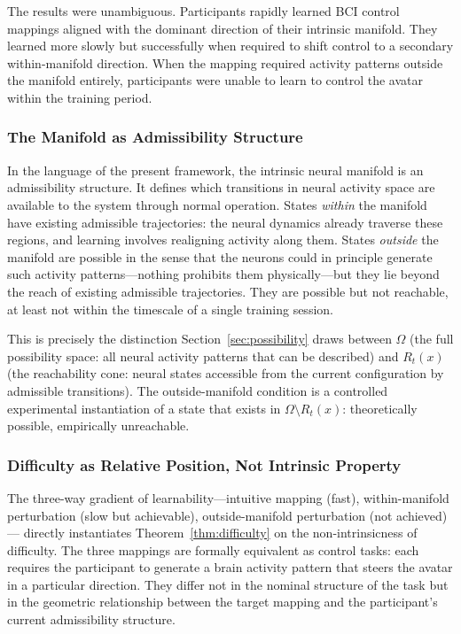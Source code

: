 \documentclass[12pt, a4paper]{article}
\theoremstyle{plain}
\theoremstyle{definition}
\theoremstyle{remark}
\begin{document}
The results were unambiguous. Participants rapidly learned BCI control
mappings aligned with the dominant direction of their intrinsic manifold.
They learned more slowly but successfully when required to shift control
to a secondary within-manifold direction. When the mapping required
activity patterns outside the manifold entirely, participants were unable
to learn to control the avatar within the training period.

\subsubsection*{The Manifold as Admissibility Structure}

In the language of the present framework, the intrinsic neural manifold
is an admissibility structure. It defines which transitions in neural
activity space are available to the system through normal operation.
States \emph{within} the manifold have existing admissible trajectories:
the neural dynamics already traverse these regions, and learning involves
realigning activity along them. States \emph{outside} the manifold are
possible in the sense that the neurons could in principle generate such
activity patterns---nothing prohibits them physically---but they lie beyond
the reach of existing admissible trajectories. They are possible but
not reachable, at least not within the timescale of a single training session.

This is precisely the distinction Section~\ref{sec:possibility} draws
between $\Omega$ (the full possibility space: all neural activity patterns
that can be described) and $R_t(x)$ (the reachability cone: neural states
accessible from the current configuration by admissible transitions). The
outside-manifold condition is a controlled experimental instantiation of
a state that exists in $\Omega \setminus R_t(x)$: theoretically possible,
empirically unreachable.

\subsubsection*{Difficulty as Relative Position, Not Intrinsic Property}

The three-way gradient of learnability---intuitive mapping (fast), within-manifold
perturbation (slow but achievable), outside-manifold perturbation (not achieved)---
directly instantiates Theorem~\ref{thm:difficulty} on the non-intrinsicness of
difficulty. The three mappings are formally equivalent as control tasks:
each requires the participant to generate a brain activity pattern that
steers the avatar in a particular direction. They differ not in the
nominal structure of the task but in the geometric relationship between
the target mapping and the participant's current admissibility structure.
\end{document}

